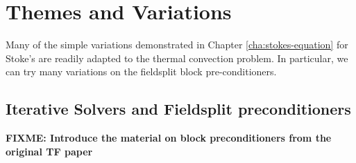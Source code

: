 \pagebreak{}
\section{Themes and Variations}
\label{sec:themes-variations}

Many of the simple variations demonstrated in Chapter
\ref{cha:stokes-equation} for Stoke's  are readily adapted
to the thermal convection problem.  In particular, we can try many
variations on the fieldsplit block pre-conditioners.

\subsection{Iterative Solvers and Fieldsplit preconditioners}
\label{sec:iterative-solvers-1}

\textbf{FIXME:  Introduce the material on block preconditioners from
  the original TF paper}

